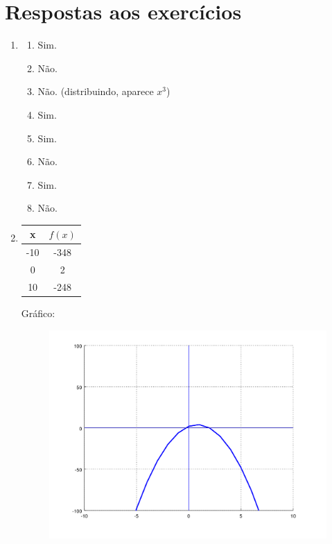 \documentclass[11pt]{article}
\begin{document}
\section{Respostas aos exercícios}
\begin{enumerate}
	\item 
	\begin{enumerate}
		\item Sim.
		\item Não.
		\item Não. (distribuindo, aparece $x^3$)
		\item Sim.
		\item Sim.
		\item Não.
		\item Sim.
		\item Não.
	\end{enumerate}

	\item 
		\begin{table}[H]
			\centering
			\begin{tabular}{| c | c |}
				\hline
				x & $f(x)$\\
				\hline
				-10 & -348\\
				\hline
				0 & 2\\
				\hline
				10 & -248\\
				\hline
			\end{tabular}
		\end{table}
		Gráfico:
		\begin{figure}[H]
			\centering
			\includegraphics[width=0.8\linewidth]{imgs2/chart8.png}
		\end{figure}
		

\end{enumerate}
\end{document}
